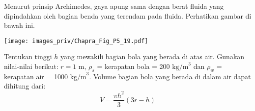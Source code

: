 \begin{soal}
Menurut prinsip Archimedes, gaya apung sama dengan berat fluida yang dipindahkan
oleh bagian benda yang terendam pada fluida.
Perhatikan gambar di bawah ini.

{\centering
\texttt{[image: images\_priv/Chapra\_Fig\_P5\_19.pdf]}
\par}

Tentukan tinggi $h$ yang mewakili bagian bola yang berada di atas air.
Gunakan nilai-nilai berikut: $r=1$ m, $\rho_{s}$ = kerapatan bola =
200 $\mathrm{kg/m}^{3}$ dan $\rho_{w}$ = kerapatan air = 1000 $\mathrm{kg/m}^{3}$.
Volume bagian bola yang berada di dalam air dapat dihitung dari:
\begin{equation}
V = \frac{\pi h^2}{3} (3r - h)
\end{equation}
\end{soal}